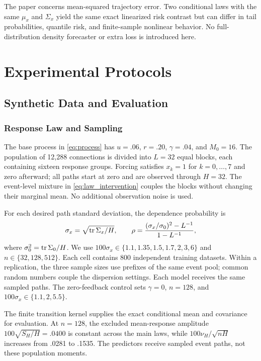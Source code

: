 The paper concerns mean-squared trajectory error. Two conditional laws with the same $\mu_x$ and $\Sigma_x$ yield the same exact linearized risk contrast but can differ in tail probabilities, quantile risk, and finite-sample nonlinear behavior. No full-distribution density forecaster or extra loss is introduced here.


\section{Experimental Protocols}\label{app:protocols_all}
\subsection{Synthetic Data and Evaluation}\label{app:numerics}
\subsubsection{Response Law and Sampling}
The base process in \eqref{eq:process} has $u=.06$, $r=.20$, $\gamma=.04$, and $M_0=16$. The population of 12,288 connections is divided into $L=32$ equal blocks, each containing sixteen response groups. Forcing satisfies $x_k=1$ for $k=0,\ldots,7$ and zero afterward; all paths start at zero and are observed through $H=32$. The event-level mixture in \eqref{eq:law_intervention} couples the blocks without changing their marginal mean. No additional observation noise is used.

For each desired path standard deviation, the dependence probability is
\begin{equation}
 \sigma_x=\sqrt{\operatorname{tr}\Sigma_x/H},\qquad
 \rho=\frac{(\sigma_x/\sigma_0)^2-L^{-1}}{1-L^{-1}},
 \label{eq:dispersion_calibration}
\end{equation}
where $\sigma_0^2=\operatorname{tr}\Sigma_0/H$. We use $100\sigma_x\in\{1.1,1.35,1.5,1.7,2,3,6\}$ and $n\in\{32,128,512\}$. Each cell contains 800 independent training datasets. Within a replication, the three sample sizes use prefixes of the same event pool; common random numbers couple the dispersion settings. Each model receives the same sampled paths. The zero-feedback control sets $\gamma=0$, $n=128$, and $100\sigma_x\in\{1.1,2,5.5\}$.

The finite transition kernel supplies the exact conditional mean and covariance for evaluation. At $n=128$, the excluded mean-response amplitude $100\sqrt{S_H/H}=.0400$ is constant across the main laws, while $100\nu_H/\sqrt{nH}$ increases from .0281 to .1535. The predictors receive sampled event paths, not these population moments.

